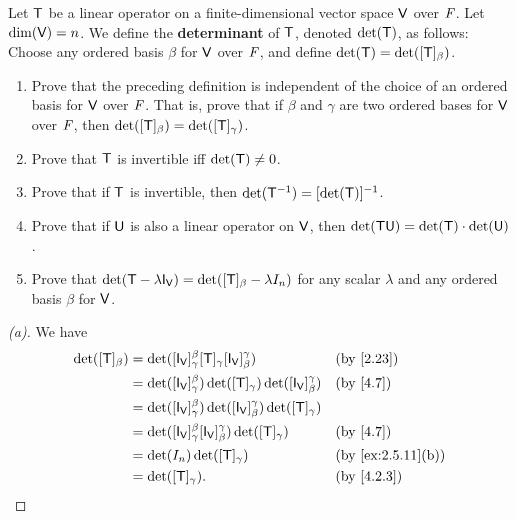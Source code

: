 \begin{ex}\label{ex:5.1.7}
  Let \(\mathsf{T}\) be a linear operator on a finite-dimensional vector space \(\mathsf{V}\) over \(\mathit{F}\).
  Let \(\dim(\mathsf{V}) = n\).
  We define the \textbf{determinant} of \(\mathsf{T}\), denoted \(\det(\mathsf{T})\), as follows:
  Choose any ordered basis \(\beta\) for \(\mathsf{V}\) over \(\mathit{F}\), and define \(\det(\mathsf{T}) = \det([\mathsf{T}]_{\beta})\).
  \begin{enumerate}
    \item Prove that the preceding definition is independent of the choice of an ordered basis for \(\mathsf{V}\) over \(\mathit{F}\).
          That is, prove that if \(\beta\) and \(\gamma\) are two ordered bases for \(\mathsf{V}\) over \(\mathit{F}\), then \(\det([\mathsf{T}]_{\beta}) = \det([\mathsf{T}]_{\gamma})\).
    \item Prove that \(\mathsf{T}\) is invertible iff \(\det(\mathsf{T}) \neq 0\).
    \item Prove that if \(\mathsf{T}\) is invertible, then \(\det(\mathsf{T}^{-1}) = [\det(\mathsf{T})]^{-1}\).
    \item Prove that if \(\mathsf{U}\) is also a linear operator on \(\mathsf{V}\), then \(\det(\mathsf{T} \mathsf{U}) = \det(\mathsf{T}) \cdot \det(\mathsf{U})\).
    \item Prove that \(\det(\T - \lambda \IT[\V]) = \det([\T]_{\beta} - \lambda I_n)\) for any scalar \(\lambda\) and any ordered basis \(\beta\) for \(\mathsf{V}\).
  \end{enumerate}
\end{ex}

\begin{proof}[(a)]
  We have
  \begin{align*}
    \det([\T]_{\beta}) & = \det([\IT[\V]]_{\gamma}^{\beta} [\T]_{\gamma} [\IT[\V]]_{\beta}^{\gamma})             &  & \by{2.23}         \\
                       & = \det([\IT[\V]]_{\gamma}^{\beta}) \det([\T]_{\gamma}) \det([\IT[\V]]_{\beta}^{\gamma}) &  & \by{4.7}          \\
                       & = \det([\IT[\V]]_{\gamma}^{\beta}) \det([\IT[\V]]_{\beta}^{\gamma}) \det([\T]_{\gamma})                        \\
                       & = \det([\IT[\V]]_{\gamma}^{\beta} [\IT[\V]]_{\beta}^{\gamma}) \det([\T]_{\gamma})       &  & \by{4.7}          \\
                       & = \det(I_n) \det([\T]_{\gamma})                                                         &  & \by{ex:2.5.11}[b] \\
                       & = \det([\T]_{\gamma}).                                                                  &  & \by{4.2.3}
  \end{align*}
\end{proof}


